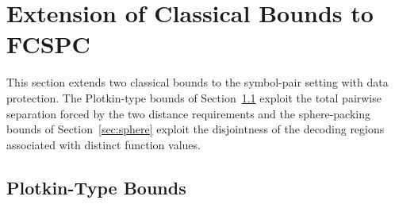 \documentclass[11pt,draftclsnofoot,journal,onecolumn]{IEEEtran}
\newtheorem{remark}{Remark}
\begin{document}



\section{Extension of Classical Bounds to FCSPC}\label{sec:bounds}
    This section extends two classical bounds to the symbol-pair setting with data protection. The Plotkin-type bounds of Section~\ref{sec:plotkin} exploit the total pairwise separation forced by the two distance requirements and the sphere-packing bounds of Section~\ref{sec:sphere} exploit the disjointness of the decoding regions associated with distinct function values. 
    
    \subsection{Plotkin-Type Bounds}
    \label{sec:plotkin}
\end{document}
